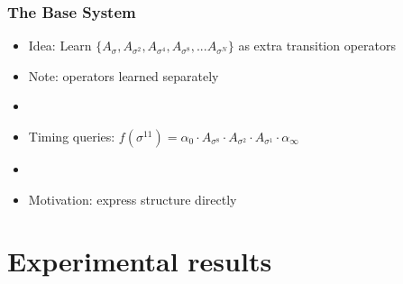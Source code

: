 \documentclass{beamer}
\begin{document}
\begin{frame}
\frametitle{The Base System}
\begin{itemize}

\item Idea: Learn $\{A_{\sigma}, A_{\sigma^2}, A_{\sigma^4}, A_{\sigma^8}, ... A_{\sigma^N}\}$ as extra transition operators
\item[] Note: operators learned separately
\item[]

\item Timing queries: $f(\sigma^{11}) = \alpha_0 \cdot A_{\sigma^8} \cdot A_{\sigma^2} \cdot A_{\sigma^1} \cdot \alpha_\infty$
\item[]
\item Motivation: express structure directly

\end{itemize}
\end{frame}

\section{Experimental results}
\end{document}
